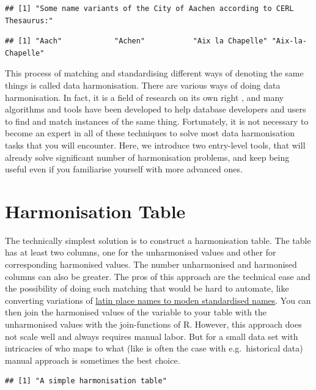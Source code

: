 \documentclass[
]{book}
\begin{document}
\begin{verbatim}
## [1] "Some name variants of the City of Aachen according to CERL Thesaurus:"
\end{verbatim}

\begin{verbatim}
## [1] "Aach"            "Achen"           "Aix la Chapelle" "Aix-la-Chapelle"
\end{verbatim}

This process of matching and standardising different ways of denoting the same things is called data harmonisation.
There are various ways of doing data harmonisation. In fact, it is a field of research on its own right \citep{Christen2012}, and many algorithms and tools have been developed to help database developers and users to find and match instances of the same thing. Fortunately, it is not necessary to become an expert in all of these techniques to solve most data harmonisation tasks that you will encounter. Here, we introduce two entry-level tools, that will already solve significant number of harmonisation problems, and keep being useful even if you familiarise yourself with more advanced ones.

\hypertarget{harmonisation-table}{%
\section{Harmonisation Table}\label{harmonisation-table}}

The technically simplest solution is to construct a harmonisation table. The table has at least two columns, one for the unharmonised values and other for corresponding harmonised values. The number unharmonised and harmonised columns can also be greater. The pros of this approach are the technical ease and the possibility of doing such matching that would be hard to automate, like converting variations of \href{https://rbms.info/lpn/a/}{latin place names to moden standardised names}. You can then join the harmonised values of the variable to your table with the unharmonised values with the join-functions of R. However, this approach does not scale well and always requires manual labor. But for a small data set with intricacies of who maps to what (like is often the case with e.g.~historical data) manual approach is sometimes the best choice.

\begin{verbatim}
## [1] "A simple harmonisation table"
\end{verbatim}
\end{document}
